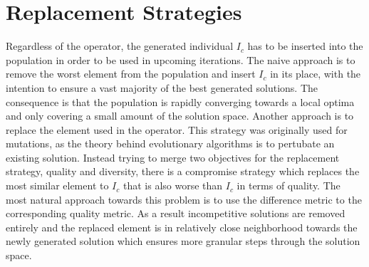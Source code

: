 \documentclass[a4paper,12pt,bibtotoc,titlepage, liststotoc,BCOR7mm,headsepline,pointlessnumbers]{scrbook}
\numberwithin{equation}{section}
\begin{document}
\section{Replacement Strategies}
Regardless of the operator, the generated individual $I_c$ has to be inserted into the population in order to be used in upcoming iterations. 
The naive approach is to remove the worst element from the population and insert $I_c$ in its place, with the intention to ensure a vast majority of the best generated solutions. The consequence is that the population is rapidly converging towards a local optima and only covering a small amount of the solution space. Another approach is to replace the element used in the operator. This strategy was originally used for mutations, as the theory behind evolutionary algorithms is to pertubate an existing solution. Instead trying to merge two objectives for the replacement strategy, quality and diversity, there is a compromise strategy which replaces the most similar element to $I_c$ that is also worse than $I_c$ in terms of quality. The most natural approach towards this problem is to use the difference metric to the corresponding quality metric. As a result incompetitive solutions are removed entirely and the replaced element is in relatively close neighborhood towards the newly generated solution which ensures more granular steps through the solution space. 
\end{document}
